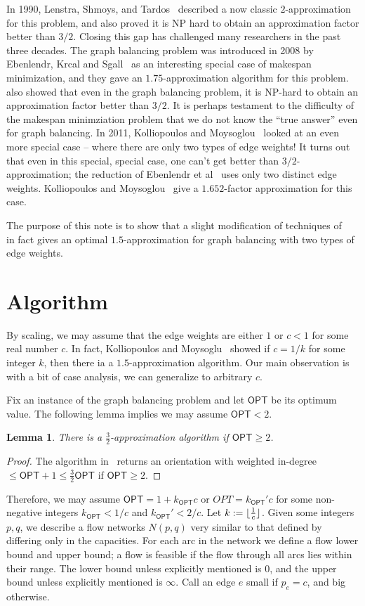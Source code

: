\documentclass[11pt]{article}
\newcommand{\OPT}{\mathsf{OPT}}
\newcommand{\kk}{k_{\scriptscriptstyle \OPT}}
\newcommand{\kkkk}{k_{\scriptscriptstyle \OPT}'}
\DeclarePairedDelimiter\floor{\lfloor}{\rfloor}
\newtheorem{lemma}{Lemma}
\begin{document}
In 1990, Lenstra, Shmoys, and Tardos~\cite{LST} described a now classic $2$-approximation for this problem, and also proved it is NP hard to obtain an approximation factor better than $3/2$. Closing this gap has challenged many researchers in the past three decades. The graph balancing problem was introduced in 2008 by  Ebenlendr, Krcal and Sgall~\cite{EKS} as an interesting special case of makespan minimization, and they gave an $1.75$-approximation algorithm for this problem. \cite{EKS} also showed that even in the graph balancing problem, it is NP-hard to obtain an approximation factor better than $3/2$. 
It is perhaps testament to the difficulty of the makespan minimziation problem that we do not know the ``true answer'' even for graph balancing. In 2011, Kolliopoulos and Moysoglou~\cite{KM} looked at an even more special case -- where there are only two types of edge weights! It turns out that even in this special, special case, one can't get better than $3/2$-approximation; the reduction of Ebenlendr et al~\cite{EKS} uses only two distinct edge weights. Kolliopoulos and Moysoglou~\cite{KM} give a $1.652$-factor approximation for this case. 

The purpose of this note is to show that a slight modification of techniques of ~\cite{KM}  in fact gives an optimal $1.5$-approximation for graph balancing with two types of edge weights.


\section{Algorithm}
By scaling, we may assume that the edge weights are either $1$ or $c < 1$ for some real number $c$. 
In fact, Kolliopoulos and Moysoglu~\cite{KM} showed if $c = 1/k$ for some integer $k$, then there ia a $1.5$-approximation algorithm. 
Our main observation is with a bit of case analysis, we can generalize to arbitrary $c$.

Fix an instance of the graph balancing problem and let $\OPT$ be its optimum value. The following lemma implies we may assume $\OPT < 2$.
\begin{lemma}\label{lem:1}
	There is a $\frac{3}{2}$-approximation algorithm if $\OPT \geq 2$. \end{lemma}
\begin{proof}
	The algorithm in~\cite{LST} returns an orientation with weighted in-degree $\le \OPT+1\le \frac{3}{2}\OPT$ if $\OPT\geq 2$. \end{proof}
Therefore, we may assume $\OPT = 1 + \kk c$ or $OPT=\kkkk c$ for some non-negative integers $\kk < 1/c$ and $\kkkk < 2/c$. 
\noindent
Let $k:=\floor{\frac{1}{c}}$. Given some integers $p,q$, we describe a flow networks $N(p,q)$ very similar to that defined by~\cite{KM} differing only in the capacities. For each arc in the network we define a flow lower bound and upper bound; a flow is feasible if the flow through all arcs lies within their range. The lower bound unless explicitly mentioned is $0$, and the upper bound unless explicitly mentioned is $\infty$.
Call an edge $e$ small if $p_e = c$, and big otherwise. \\
\end{document}
